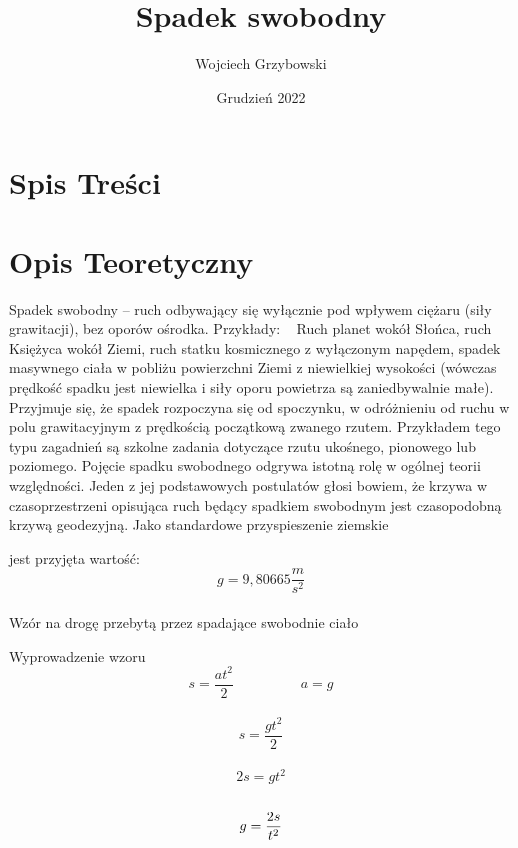 \documentclass[14pt, letterpaper]{article}
\title{Spadek swobodny}
\author{Wojciech Grzybowski}
\date{Grudzień 2022}
\begin{document}
\maketitle

\section{Spis Treści}
\section{Opis Teoretyczny}

Spadek swobodny – ruch odbywający się wyłącznie pod wpływem ciężaru
(siły grawitacji), bez oporów ośrodka.
Przykłady:
 
Ruch planet wokół Słońca, ruch Księżyca wokół Ziemi, ruch statku kosmicznego 
z wyłączonym napędem, spadek masywnego ciała w pobliżu powierzchni Ziemi 
z niewielkiej wysokości 
(wówczas prędkość spadku jest niewielka i siły oporu powietrza są zaniedbywalnie małe).
Przyjmuje się, że spadek rozpoczyna się od spoczynku, w odróżnieniu od ruchu 
w polu grawitacyjnym z prędkością początkową zwanego rzutem. 
Przykładem tego typu zagadnień są szkolne zadania dotyczące rzutu ukośnego, pionowego 
lub poziomego. Pojęcie spadku swobodnego odgrywa istotną rolę w ogólnej 
teorii względności. Jeden z jej podstawowych postulatów głosi bowiem,
że krzywa w czasoprzestrzeni opisująca ruch będący spadkiem swobodnym 
jest czasopodobną krzywą geodezyjną.
Jako standardowe przyspieszenie ziemskie 

jest przyjęta wartość: \begin{equation}
    g = 9,80665 \frac{m}{s^2}
\end{equation} \\

Wzór na drogę przebytą przez spadające swobodnie ciało

Wyprowadzenie wzoru\\
\begin{equation} 
    s = \frac{at^2}{2} \hspace{2cm} a=g  \end{equation}   \\ 
     \begin{equation} s = \frac{gt^2}{2}  \end{equation} \\
   \begin{equation}   2s=gt^2  \end{equation} \\
   \begin{equation}  g=\frac{2s}{t^2}\\ \end{equation} 
\end{document}
